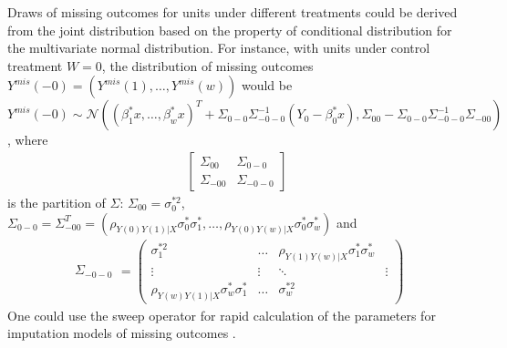 	Draws of missing outcomes for units under different treatments could be derived from the joint distribution based on the property of conditional distribution for the multivariate normal distribution. For instance, with units under control treatment $W = 0$, the distribution of missing outcomes $Y^{mis}(-0) = (Y^{mis}(1), \dots, Y^{mis}(w))$ would be $Y^{mis}(-0) \sim \mathcal{N} ((\beta^{*}_{1}x, \dots, \beta^{*}_{w}x)^T + \Sigma_{0-0}\Sigma_{-0-0}^{-1}(Y_0 - \beta^{*}_{0}x), \Sigma_{00} - \Sigma_{0-0}\Sigma_{-0-0}^{-1}\Sigma_{-00})$, where
	\begin{eqnarray}
		\left[\begin{array}{cc}
			\Sigma_{00} & \Sigma_{0-0}\\
			\Sigma_{-00} & \Sigma_{-0-0}
		\end{array}\right]
	\end{eqnarray}
	is the partition of $\Sigma$: $\Sigma_{00} = \sigma^{*2}_{0}$, $\Sigma_{0-0} = \Sigma_{-00}^T = (\rho_{Y(0)Y(1)|X}\sigma^{*}_{0}\sigma^{*}_{1}, \dots, \rho_{Y(0)Y(w)|X}\sigma^{*}_{0}\sigma^{*}_{w})$ and 
	\begin{eqnarray}
		\begin{array}{c}
			\Sigma_{-0-0}
		\end{array} = \left(\begin{array}{cccc}
			\sigma^{*2}_{1} & \dots & \rho_{Y(1)Y(w)|X}\sigma^{*}_{1}\sigma^{*}_{w}\\
			\vdots & \vdots & \ddots & \vdots\\
			\rho_{Y(w)Y(1)|X}\sigma^{*}_{w}\sigma^{*}_{1} & \dots & \sigma^{*2}_{w}
		\end{array}\right)
	\end{eqnarray} 
	One could use the sweep operator for rapid calculation of the parameters for imputation models of missing outcomes \citep{goodnight1979tutorial}. 
	
